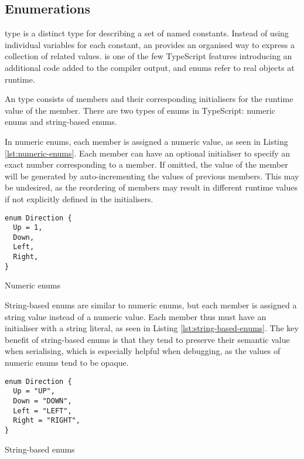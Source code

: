 \subsection{Enumerations}

 type is a distinct type for describing a set of named constants. Instead of using individual variables for each constant, an  provides an organised way to express a collection of related values.  is one of the few TypeScript features introducing an additional code added to the compiler output, and enums refer to real objects at runtime.

An  type consists of members and their corresponding initialisers for the runtime value of the member. There are two types of enums in TypeScript: numeric enums and string-based enums. 

\clearpage

In numeric enums, each member is assigned a numeric value, as seen in Listing \ref{lst:numeric-enums}. Each member can have an optional initialiser to specify an exact number corresponding to a member. If omitted, the value of the member will be generated by auto-incrementing the values of previous  members. This may be undesired, as the reordering of members may result in different runtime values if not explicitly defined in the initialisers.

\begin{listing}[ht]
  \begin{verbatim}
enum Direction {
  Up = 1,
  Down,
  Left,
  Right,
}
\end{verbatim}
  \caption{Numeric enums}\label{lst:numeric-enums}
\end{listing}

String-based enums are similar to numeric enums, but each member is assigned a string value instead of a numeric value. Each member thus must have an initialiser with a string literal, as seen in Listing \ref{lst:string-based-enums}. The key benefit of string-based enums is that they tend to preserve their semantic value when serialising, which is especially helpful when debugging, as the values of numeric enums tend to be opaque. 

\begin{listing}[ht]
  \begin{verbatim}
enum Direction {
  Up = "UP",
  Down = "DOWN",
  Left = "LEFT",
  Right = "RIGHT",
}
\end{verbatim}
  \caption{String-based enums}\label{lst:string-based-enums}
\end{listing}

